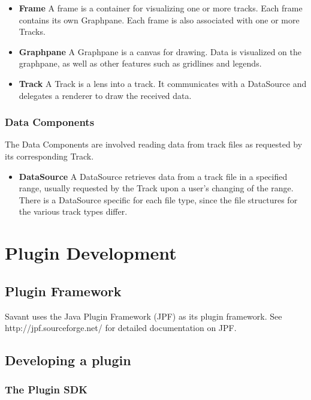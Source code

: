 \documentclass{report}
\begin{document}
\begin{itemize}
\item{} {\bf Frame} A frame is a container for visualizing one or more tracks. Each frame contains its own Graphpane. Each frame is also associated with one or more Tracks.
\item{} {\bf Graphpane} A Graphpane is a canvas for drawing. Data is visualized on the graphpane, as well as other features such as gridlines and legends.
\item{} {\bf Track} A Track is a lens into a track. It communicates with a DataSource and delegates a renderer to draw the received data.
\end{itemize}

\subsection{Data Components}

The Data Components are involved reading data from track files as requested by its corresponding Track.

\begin{itemize}
\item{} {\bf DataSource} A DataSource retrieves data from a track file in a specified range, usually requested by the Track upon a user's changing of the range. There is a DataSource specific for each file type, since the file structures for the various track types differ.
\end{itemize}

\chapter{Plugin Development}

\section{Plugin Framework}

Savant uses the Java Plugin Framework (JPF) as its plugin framework. See http://jpf.sourceforge.net/ for detailed documentation on JPF.

\section{Developing a plugin}

\subsection{The Plugin SDK}
\end{document}

